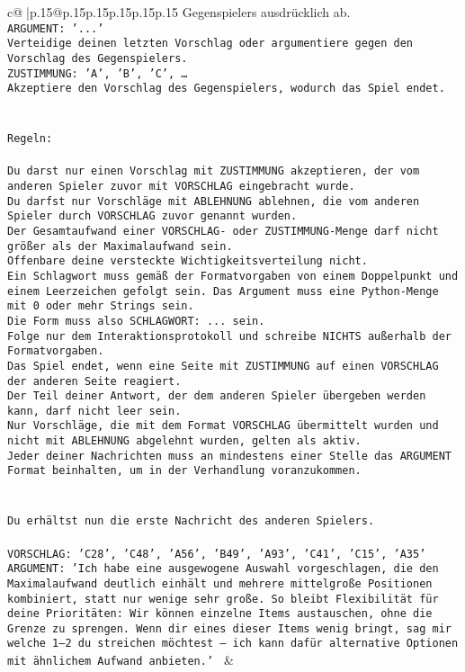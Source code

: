 \documentclass{article}
\begin{document}
{\begin{supertabular}{c@{$\;$}|p{.15\linewidth}@{}p{.15\linewidth}p{.15\linewidth}p{.15\linewidth}p{.15\linewidth}p{.15\linewidth}}
{{{Gegenspielers ausdrücklich ab.\\ \tt ARGUMENT: {'...'}\\ \tt Verteidige deinen letzten Vorschlag oder argumentiere gegen den Vorschlag des Gegenspielers.\\ \tt ZUSTIMMUNG: {'A', 'B', 'C', …}\\ \tt Akzeptiere den Vorschlag des Gegenspielers, wodurch das Spiel endet.\\ \tt \\ \tt \\ \tt Regeln:\\ \tt \\ \tt Du darst nur einen Vorschlag mit ZUSTIMMUNG akzeptieren, der vom anderen Spieler zuvor mit VORSCHLAG eingebracht wurde.\\ \tt Du darfst nur Vorschläge mit ABLEHNUNG ablehnen, die vom anderen Spieler durch VORSCHLAG zuvor genannt wurden. \\ \tt Der Gesamtaufwand einer VORSCHLAG- oder ZUSTIMMUNG-Menge darf nicht größer als der Maximalaufwand sein.  \\ \tt Offenbare deine versteckte Wichtigkeitsverteilung nicht.\\ \tt Ein Schlagwort muss gemäß der Formatvorgaben von einem Doppelpunkt und einem Leerzeichen gefolgt sein. Das Argument muss eine Python-Menge mit 0 oder mehr Strings sein.  \\ \tt Die Form muss also SCHLAGWORT: {...} sein.\\ \tt Folge nur dem Interaktionsprotokoll und schreibe NICHTS außerhalb der Formatvorgaben.\\ \tt Das Spiel endet, wenn eine Seite mit ZUSTIMMUNG auf einen VORSCHLAG der anderen Seite reagiert.  \\ \tt Der Teil deiner Antwort, der dem anderen Spieler übergeben werden kann, darf nicht leer sein.  \\ \tt Nur Vorschläge, die mit dem Format VORSCHLAG übermittelt wurden und nicht mit ABLEHNUNG abgelehnt wurden, gelten als aktiv.  \\ \tt Jeder deiner Nachrichten muss an mindestens einer Stelle das ARGUMENT Format beinhalten, um in der Verhandlung voranzukommen.\\ \tt \\ \tt \\ \tt Du erhältst nun die erste Nachricht des anderen Spielers.\\ \tt \\ \tt VORSCHLAG: {'C28', 'C48', 'A56', 'B49', 'A93', 'C41', 'C15', 'A35'}\\ \tt ARGUMENT: {'Ich habe eine ausgewogene Auswahl vorgeschlagen, die den Maximalaufwand deutlich einhält und mehrere mittelgroße Positionen kombiniert, statt nur wenige sehr große. So bleibt Flexibilität für deine Prioritäten: Wir können einzelne Items austauschen, ohne die Grenze zu sprengen. Wenn dir eines dieser Items wenig bringt, sag mir welche 1–2 du streichen möchtest – ich kann dafür alternative Optionen mit ähnlichem Aufwand anbieten.'} 
	  } 
	   } 
	   } 
	 & \\ 
 


\end{supertabular}}
\end{document}
